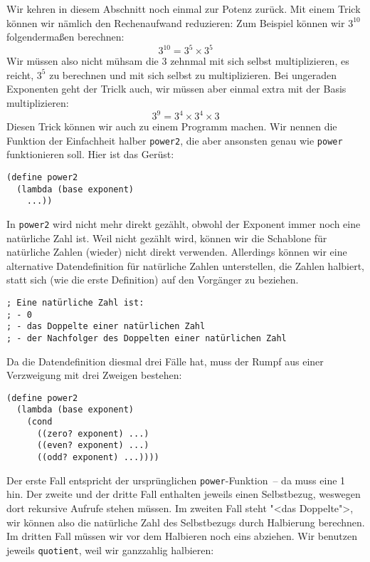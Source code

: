 Wir kehren in diesem Abschnitt noch einmal zur Potenz zurück.  Mit
einem Trick können wir nämlich den Rechenaufwand reduzieren: Zum
Beispiel können wir $3^{10}$ folgendermaßen berechnen:
%
\begin{displaymath}
  3^{10}   = 3^5 \times 3^5
\end{displaymath}
%
Wir müssen also nicht mühsam die 3 zehnmal mit sich selbst
multiplizieren, es reicht, $3^5$ zu berechnen und mit sich selbst zu
multiplizieren.  Bei ungeraden Exponenten geht der Triclk auch, wir müssen aber einmal extra
mit der Basis multiplizieren:
%
\begin{displaymath}
  3^9   = 3^4 \times 3^4 \times 3
\end{displaymath}
%
Diesen Trick können wir auch zu einem Programm machen.  Wir nennen die
Funktion der Einfachheit halber \lstinline{power2}, die aber ansonsten
genau wie \lstinline{power} funktionieren soll.  Hier ist das Gerüst:
%
\begin{lstlisting}
(define power2
  (lambda (base exponent)
    ...))
\end{lstlisting}
%
In \lstinline{power2} wird nicht mehr direkt gezählt, obwohl der
Exponent immer noch eine natürliche Zahl ist.  Weil nicht gezählt
wird, können wir die Schablone für natürliche Zahlen (wieder) nicht
direkt verwenden.  Allerdings können wir eine alternative
Datendefinition für natürliche Zahlen unterstellen, die Zahlen
halbiert, statt sich (wie die erste Definition) auf den Vorgänger zu beziehen.
%
\begin{lstlisting}
; Eine natürliche Zahl ist:
; - 0
; - das Doppelte einer natürlichen Zahl
; - der Nachfolger des Doppelten einer natürlichen Zahl
\end{lstlisting}
%
Da die Datendefinition diesmal drei Fälle hat, muss der Rumpf aus
einer Verzweigung mit drei Zweigen bestehen:
%
\begin{lstlisting}
(define power2
  (lambda (base exponent)
    (cond
      ((zero? exponent) ...)
      ((even? exponent) ...)
      ((odd? exponent) ...))))
\end{lstlisting}
%
Der erste Fall entspricht der ursprünglichen
\lstinline{power}-Funktion~-- da muss eine 1 hin.  Der zweite und der
dritte Fall enthalten jeweils einen Selbstbezug, weswegen dort
rekursive Aufrufe stehen müssen.  Im zweiten Fall steht "<das
Doppelte">, wir können also die natürliche Zahl des Selbstbezugs durch
Halbierung berechnen.  Im dritten Fall müssen wir vor dem Halbieren
noch eins abziehen.  Wir benutzen jeweils \lstinline{quotient}, weil
wir ganzzahlig halbieren:
